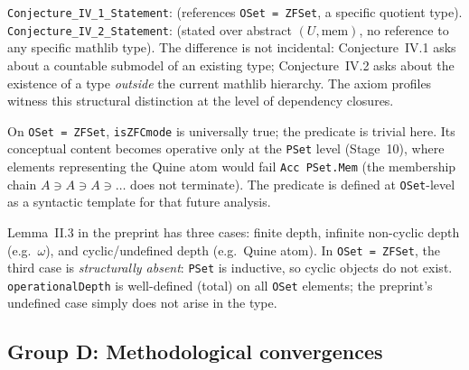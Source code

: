 \begin{remark}
\label{rem:C2_profiles}
\leanok
{}
\texttt{Conjecture\_IV\_1\_Statement}: 
(references \texttt{OSet = ZFSet}, a specific quotient type).
\texttt{Conjecture\_IV\_2\_Statement}: \axiomprofile{[]} (stated over
abstract $(U, \mathrm{mem})$, no reference to any specific mathlib type).
The difference is not incidental: Conjecture~IV.1 asks about a countable
submodel of an existing type; Conjecture~IV.2 asks about the existence of
a type \emph{outside} the current mathlib hierarchy.  The axiom profiles
witness this structural distinction at the level of dependency closures.
\end{remark}

\begin{remark}
\label{rem:C3_isZFCmode}
\leanok
{}
On \texttt{OSet = ZFSet}, \texttt{isZFCmode} is universally true;
the predicate is trivial here.  Its conceptual content becomes operative
only at the \texttt{PSet} level (Stage~10), where elements representing
the Quine atom would fail \texttt{Acc PSet.Mem} (the membership chain
$A \ni A \ni A \ni \ldots$ does not terminate).  The predicate is
defined at \texttt{OSet}-level as a syntactic template for that future
analysis.
\end{remark}

\begin{remark}
\label{rem:C4_depth_cyclic}
\leanok
{}
Lemma~II.3 in the preprint has three cases: finite depth, infinite
non-cyclic depth (e.g.\ $\omega$), and cyclic/undefined depth (e.g.\
Quine atom).  In \texttt{OSet = ZFSet}, the third case is
\emph{structurally absent}: \texttt{PSet} is inductive, so cyclic
objects do not exist.  \texttt{operationalDepth} is well-defined
(total) on all \texttt{OSet} elements; the preprint's undefined case
simply does not arise in the type.
\end{remark}

\subsection*{Group D: Methodological convergences}

